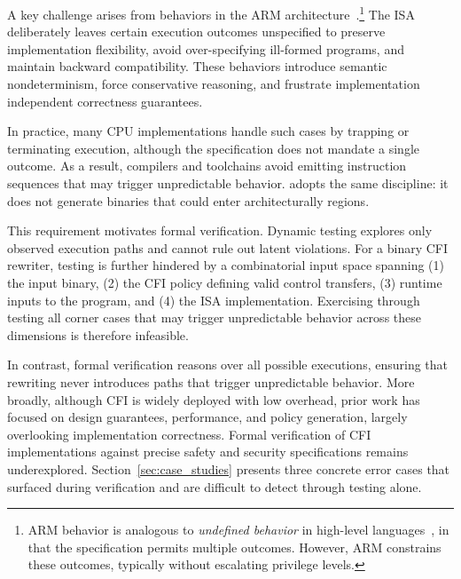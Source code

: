 A key challenge arises from \unpredictable behaviors in the ARM architecture~\cite{unpredictable_behaviors}.\footnote{ARM \unpredictable behavior is analogous to \emph{undefined behavior} in high-level languages~\cite{undefined0,undefined1}, in that the specification permits multiple outcomes. However, ARM constrains these outcomes, typically without escalating privilege levels.} The ISA deliberately leaves certain execution outcomes unspecified to preserve implementation flexibility, avoid over-specifying ill-formed programs, and maintain backward compatibility. These behaviors introduce semantic nondeterminism, force conservative reasoning, and frustrate implementation independent correctness guarantees.

In practice, many CPU implementations handle such cases by trapping or terminating execution, although the specification does not mandate a single outcome. As a result, compilers and toolchains avoid emitting instruction sequences that may trigger unpredictable behavior. \pname adopts the same discipline: it does not generate binaries that could enter architecturally \unpredictable regions.

This requirement motivates formal verification. Dynamic testing explores only observed execution paths and cannot rule out latent violations. For a binary CFI rewriter, testing is further hindered by a combinatorial input space spanning (1) the input binary, (2) the CFI policy defining valid control transfers, (3) runtime inputs to the program, and (4) the ISA implementation. Exercising through testing all corner cases that may trigger unpredictable behavior across these dimensions is therefore infeasible.

In contrast, formal verification reasons over all possible executions, ensuring that rewriting never introduces paths that trigger unpredictable behavior. More broadly, although CFI is widely deployed with low overhead, prior work has focused on design guarantees, performance, and policy generation, largely overlooking implementation correctness. Formal verification of CFI implementations against precise safety and security specifications remains underexplored. Section~\ref{sec:case_studies} presents three concrete error cases that surfaced during verification and are difficult to detect through testing alone.


